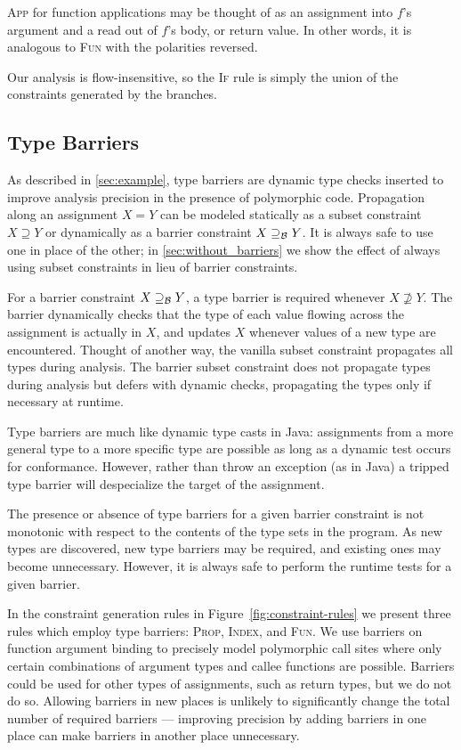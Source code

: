 \textsc{App} for function applications may be thought of as an assignment into
$f$'s argument and a read out of $f$'s body, or return value. In other words,
it is analogous to \textsc{Fun} with the polarities reversed.

Our analysis is flow-insensitive, so the \textsc{If} rule is simply the union
of the constraints generated by the branches.

\subsection{Type Barriers}
\label{sec:analysis-barriers}

As described in \Section\ref{sec:example}, type barriers are dynamic type checks
inserted to improve analysis precision in the presence
of polymorphic code.
Propagation along an assignment $X = Y$ can be modeled
statically as a subset
constraint $X \supseteq Y$ or dynamically as a barrier constraint
$X \supseteq_\mathcal{B} Y$.
It is always safe to use one in place of the other; in \Section\ref{sec:without_barriers}
we show the effect of always using subset constraints in lieu of
barrier constraints.

For a barrier constraint $X \supseteq_\mathcal{B} Y$, a type barrier is required whenever
$X \not\supseteq Y$. The barrier dynamically checks that the type of each value
flowing across the assignment is actually in $X$, and updates $X$ whenever
values of a new type are encountered.
Thought of another way, the vanilla subset constraint propagates
all types during analysis. The barrier subset constraint does not propagate
types during analysis but defers with dynamic checks, propagating the types
only if necessary at runtime.

Type barriers are much like dynamic type casts in Java: assignments from a
more general type to a more specific type are possible as long as a
dynamic test occurs for conformance.
However, rather than throw an exception (as in Java) a tripped type barrier will
despecialize the target of the assignment.

The presence or absence of type barriers for a given barrier constraint is not
monotonic with respect to the contents of the type sets in the program.  As
new types are discovered, new type barriers may be required, and existing ones
may become unnecessary.  However, it is always safe to perform the runtime
tests for a given barrier.

In the constraint generation rules in Figure~\ref{fig:constraint-rules} we
present three rules which employ type barriers:
\textsc{Prop}, \textsc{Index}, and \textsc{Fun}. We use barriers on function
argument binding to precisely model polymorphic call sites where
only certain combinations of argument types and callee functions are possible.
Barriers could be used for other types of assignments, such as return types, but we do not do so.
Allowing barriers in new places is unlikely to significantly change the total
number of required barriers --- improving precision by adding barriers in one
place can make barriers in another place unnecessary.

